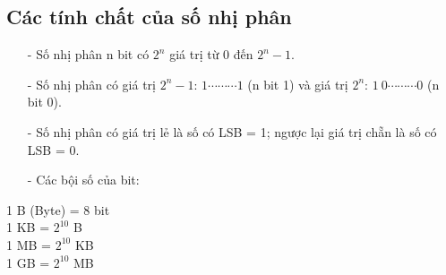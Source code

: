 \subsection{Các tính chất của số nhị phân}
\begin{itemize}
    \item[-] Số nhị phân n bit có $2^n$ giá trị từ $0$ đến $2^n-1$.
    \item[-] Số nhị phân có giá trị $2^n-1$: $1\cdots \cdots \cdots 1$ (n bit 1) và giá trị $2^n$: $1 \ 0 \cdots \cdots \cdots 0$ (n bit 0).
    \item[-] Số nhị phân có giá trị lẻ là số có LSB = 1; ngược lại giá trị chẵn là số có LSB = 0.
    \item[-] Các bội số của bit:
\end{itemize}
\begin{center}
    1 B (Byte) = 8 bit \\
    1 KB = $2^{10}$ B \\
    1 MB = $2^{10}$ KB \\
    1 GB = $2^{10}$ MB 
\end{center}
